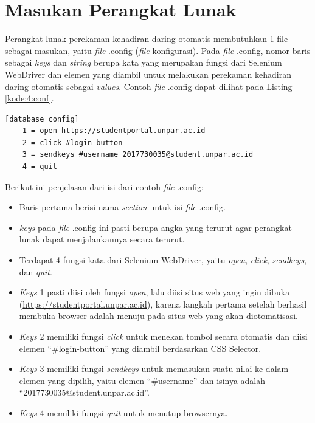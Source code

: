 \section{Masukan Perangkat Lunak}
\label{sec:inputConfig} 
Perangkat lunak perekaman kehadiran daring otomatis membutuhkan 1 file sebagai masukan, yaitu \textit{file} .config (\textit{file} konfigurasi). Pada \textit{file} .config, nomor baris sebagai \textit{keys} dan \textit{string} berupa kata yang merupakan fungsi dari Selenium WebDriver dan elemen yang diambil untuk melakukan perekaman kehadiran daring otomatis sebagai \textit{values}. Contoh \textit{file} .config dapat dilihat pada Listing \ref{kode:4:conf}.
\begin{lstlisting}[caption=Contoh \textit{file} .config untuk Masukan Perangkat Lunak Perekaman Kehadiran Daring Otomatis, label=kode:4:conf]
	[database_config]
	1 = open https://studentportal.unpar.ac.id
	2 = click #login-button
	3 = sendkeys #username 2017730035@student.unpar.ac.id 
	4 = quit
\end{lstlisting}
Berikut ini penjelasan dari isi dari contoh \textit{file} .config:
\begin{itemize}
	\item Baris pertama berisi nama \textit{section} untuk isi \textit{file} .config.
	\item \textit{keys} pada \textit{file} .config ini pasti berupa angka yang terurut agar perangkat lunak dapat menjalankannya secara terurut.
	\item Terdapat 4 fungsi kata dari Selenium WebDriver, yaitu \textit{open}, \textit{click}, \textit{sendkeys}, dan \textit{quit}.
	\item \textit{Keys} 1 pasti diisi oleh fungsi \textit{open}, lalu diisi situs web yang ingin dibuka (\url{https://studentportal.unpar.ac.id}), karena langkah pertama setelah berhasil membuka browser adalah menuju pada situs web yang akan diotomatisasi.
	\item \textit{Keys} 2 memiliki fungsi \textit{click} untuk menekan tombol secara otomatis dan diisi elemen ``\#login-button'' yang diambil berdasarkan CSS Selector.
	\item \textit{Keys} 3 memiliki fungsi \textit{sendkeys} untuk memasukan suatu nilai ke dalam elemen yang dipilih, yaitu elemen ``\#username'' dan isinya adalah ``2017730035@student.unpar.ac.id''.
	\item \textit{Keys} 4 memiliki fungsi \textit{quit} untuk menutup browsernya.
\end{itemize}
	